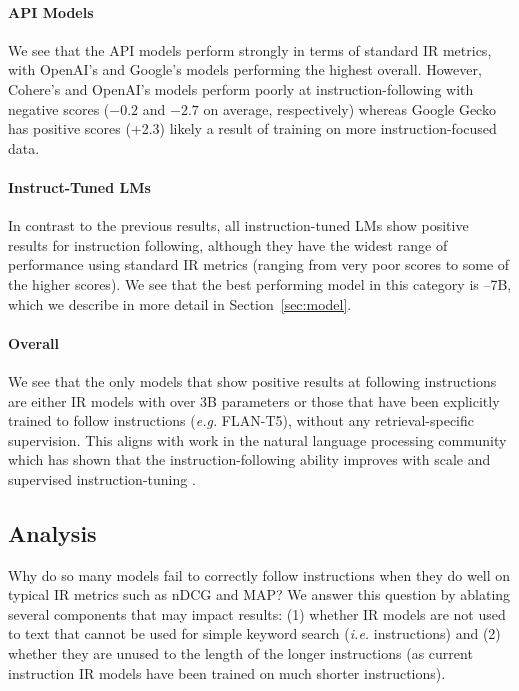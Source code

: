 \documentclass{article} %
\begin{document}
\paragraph{API Models}
We see that the API models perform strongly in terms of standard IR metrics, with OpenAI's and Google's models performing the highest overall. However, Cohere's and OpenAI's models perform poorly at instruction-following with negative scores ($-0.2$ and $-2.7$ on average, respectively) whereas Google Gecko has positive scores (+2.3) likely a result of training on more instruction-focused data. 

\paragraph{Instruct-Tuned LMs} In contrast to the previous results, all instruction-tuned LMs show positive results for instruction following, although they have the widest range of performance using standard IR metrics (ranging from very poor scores to some of the higher scores). We see that the best performing model in this category is \dataset--7B, which we describe in more detail in Section~\ref{sec:model}. 

\paragraph{Overall} We see that the only models that show positive results at following instructions are either IR models with over 3B parameters or those that have been explicitly trained to follow instructions (\textit{e.g.} FLAN-T5), 
without any retrieval-specific supervision.
This aligns with work in the natural language processing community which has shown that the instruction-following ability improves with scale \citep{brown2020language} and supervised instruction-tuning \citep{longpre2023flan}.





\subsection{Analysis}
Why do so many models fail to correctly follow instructions when they do well on typical IR metrics such as nDCG and MAP? We answer this question by ablating several components that may impact results: (1) whether IR models are not used to text that cannot be used for simple keyword search (\textit{i.e.} instructions) and (2) whether they are unused to the length of the longer instructions (as current instruction IR models have been trained on much shorter instructions).
\end{document}
